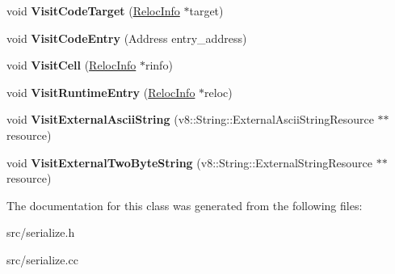 \begin{DoxyCompactItemize}
\item 
\hypertarget{classv8_1_1internal_1_1_serializer_1_1_object_serializer_af9be1cd33954e9d4778e7180aa331d5c}{}void {\bfseries Visit\+Code\+Target} (\hyperlink{classv8_1_1internal_1_1_reloc_info}{Reloc\+Info} $\ast$target)\label{classv8_1_1internal_1_1_serializer_1_1_object_serializer_af9be1cd33954e9d4778e7180aa331d5c}

\item 
\hypertarget{classv8_1_1internal_1_1_serializer_1_1_object_serializer_a463cb0af1db5a5d1dc3b434d4d88b8ab}{}void {\bfseries Visit\+Code\+Entry} (Address entry\+\_\+address)\label{classv8_1_1internal_1_1_serializer_1_1_object_serializer_a463cb0af1db5a5d1dc3b434d4d88b8ab}

\item 
\hypertarget{classv8_1_1internal_1_1_serializer_1_1_object_serializer_a1861e289f5b20f8c357bd03ea0624014}{}void {\bfseries Visit\+Cell} (\hyperlink{classv8_1_1internal_1_1_reloc_info}{Reloc\+Info} $\ast$rinfo)\label{classv8_1_1internal_1_1_serializer_1_1_object_serializer_a1861e289f5b20f8c357bd03ea0624014}

\item 
\hypertarget{classv8_1_1internal_1_1_serializer_1_1_object_serializer_a41281a36d43004ca6d0dd4b166d820e4}{}void {\bfseries Visit\+Runtime\+Entry} (\hyperlink{classv8_1_1internal_1_1_reloc_info}{Reloc\+Info} $\ast$reloc)\label{classv8_1_1internal_1_1_serializer_1_1_object_serializer_a41281a36d43004ca6d0dd4b166d820e4}

\item 
\hypertarget{classv8_1_1internal_1_1_serializer_1_1_object_serializer_a65443cdb456edf9b6aa637a50fb8a509}{}void {\bfseries Visit\+External\+Ascii\+String} (v8\+::\+String\+::\+External\+Ascii\+String\+Resource $\ast$$\ast$resource)\label{classv8_1_1internal_1_1_serializer_1_1_object_serializer_a65443cdb456edf9b6aa637a50fb8a509}

\item 
\hypertarget{classv8_1_1internal_1_1_serializer_1_1_object_serializer_af87a692db7fa0710d1452fbec298e245}{}void {\bfseries Visit\+External\+Two\+Byte\+String} (v8\+::\+String\+::\+External\+String\+Resource $\ast$$\ast$resource)\label{classv8_1_1internal_1_1_serializer_1_1_object_serializer_af87a692db7fa0710d1452fbec298e245}

\end{DoxyCompactItemize}


The documentation for this class was generated from the following files\+:\begin{DoxyCompactItemize}
\item 
src/serialize.\+h\item 
src/serialize.\+cc\end{DoxyCompactItemize}
